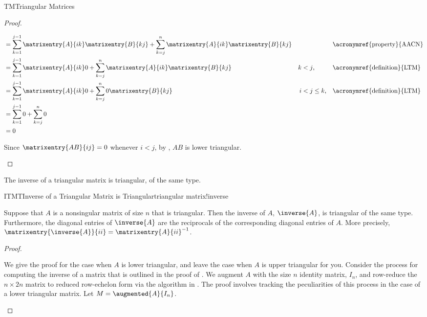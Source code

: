 \begin{subsect}{TM}{Triangular Matrices}
\begin{proof}
\begin{para}
\begin{align*}
&=
\sum_{k=1}^{j-1}\matrixentry{A}{ik}\matrixentry{B}{kj}
+
\sum_{k=j}^{n}\matrixentry{A}{ik}\matrixentry{B}{kj}
&&&&\text{\acronymref{property}{AACN}}\\
&=
\sum_{k=1}^{j-1}\matrixentry{A}{ik}0
+
\sum_{k=j}^{n}\matrixentry{A}{ik}\matrixentry{B}{kj}
&k&<j\text{,}&&\text{\acronymref{definition}{LTM}}\\
&=
\sum_{k=1}^{j-1}\matrixentry{A}{ik}0
+
\sum_{k=j}^{n}0\matrixentry{B}{kj}
&i&<j\leq k\text{,}&&\text{\acronymref{definition}{LTM}}\\
&=
\sum_{k=1}^{j-1}0+\sum_{k=j}^{n}0\\
&=
0
\end{align*}
\end{para}
%
\begin{para}Since $\matrixentry{AB}{ij}=0$ whenever
$i<j$,
by , $AB$ is lower triangular.\end{para}
%
\end{proof}
%
\begin{para}The inverse of a triangular matrix is triangular, of the same type.\end{para}
%
\begin{theorem}{ITMT}{Inverse of a Triangular Matrix is Triangular}{triangular matrix!inverse}
\begin{para}Suppose that $A$ is a nonsingular matrix of size $n$ that is triangular.  Then the inverse of $A$, $\inverse{A}$, is triangular of the same type.  Furthermore, the diagonal entries of $\inverse{A}$ are the reciprocals of the corresponding diagonal entries of $A$.  More precisely, $\matrixentry{\inverse{A}}{ii}=\matrixentry{A}{ii}^{-1}$.\end{para}
\end{theorem}
%
\begin{proof}
\begin{para}We give the proof for the case when $A$ is lower triangular, and leave the case when $A$ is upper triangular for you.  Consider the process for computing the inverse of a matrix that is outlined in the proof of .  We augment $A$ with the size $n$ identity matrix, $I_n$, and row-reduce the $n\times 2n$ matrix to reduced row-echelon form via the algorithm in .  The proof involves tracking the peculiarities of this process in the case of a lower triangular matrix.  Let $M=\augmented{A}{I_n}$.\end{para}
%

\end{proof}
\end{subsect}
